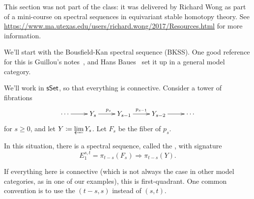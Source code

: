 This section was not part of the class: it was delivered by Richard Wong as part of a mini-course on spectral
sequences in equivariant stable homotopy theory. See
\url{https://www.ma.utexas.edu/users/richard.wong/2017/Resources.html} for more information.

We'll start with the Bousfield-Kan spectral sequence (BKSS). One good reference for this is Guillou's
notes~\cite{Guillou}, and Hans Baues~\cite{Baues} set it up in a general model category.

We'll work in $\mathsf{sSet}$, so that everything is connective. Consider a tower of fibrations
\begin{equation}
\label{fibtower}
\xymatrix{
	\dotsb\ar[r] & Y_s\ar[r]^{p_s} & Y_{s-1}\ar[r]^{p_{s-1}} &Y_{s-2}\ar[r] & \dotsb 
}
\end{equation}
for $s\ge 0$, and let $Y\coloneqq \varprojlim Y_s$. Let $F_s$ be the fiber of $p_s$.
\begin{thm}
In this situation, there is a spectral sequence, called the , with signature
\[E_1^{s,t} = \pi_{t-s}(F_s)\Longrightarrow \pi_{t-s}(Y).\]
\end{thm}
If everything here is connective (which is not always the case in other model categories, as in one of our
examples), this is first-quadrant. One common convention is to use the  $(t-s,s)$ instead of
$(s,t)$.

